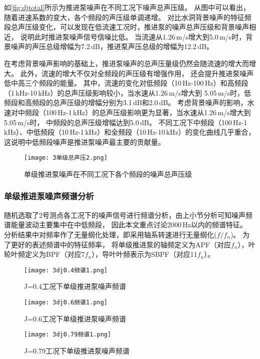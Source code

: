 如\autoref{fig:djtotal}所示为推进泵噪声在不同工况下噪声总声压级。
从图中可以看出，随着进速系数的变大，各个频段的声压级单调递增。
对比水洞背景噪声的特征频段总声压级变化，可以发现在低流速工况时，推进泵的噪声总声压级和背景噪声相近，
说明此时推进泵噪声信号信噪比低。
当流速从1.26\,m/s增大到5.0\,m/s时，背景噪声的声压总级增幅为7.2\,dB，推进泵声压总级的增幅为12.2\,dB。

在考虑背景噪声影响的基础上，推进泵噪声的总声压量级仍然会随流速的增大而增大。
此外，流速的增大不仅对全频段的声压级有增强作用，
还会提升推进泵噪声低中高三个频段的能量。
其中，流速的变化对低频段（10\,Hz-100\,Hz）和高频段（1\,kHz-10\,kHz）的总声压级影响较小，当水速从1.26\,m/s增大到
5.05\,m/s时，低频段和高频段的总声压级的增幅分别为3.1\,dB和2.0\,dB。
考虑背景噪声的影响，水速对中频段（100\,Hz-1\,kHz）的总声压级影响更为显著，当水速从1.26\,m/s增大到5.05\,m/s时，
中频段的总声压级增幅达到5.0\,dB。
不同工况下中频段（100\,Hz-1\,kHz）、中低频段（10\,Hz-1\,kHz）和全频段（10\,Hz-10\,kHz）的变化曲线几乎重合，
这说明中低频段噪声是推进泵噪声最主要的贡献量。
\begin{figure}[htbp]
    \centering
    \texttt{[image: 3单级总声压2.png]}
    \caption{\label{fig:djtotal}单级推进泵噪声在不同工况下各个频段的噪声总声压级}
\end{figure}
\subsubsection{单级推进泵噪声频谱分析}
随机选取了2号测点各工况下的噪声信号进行频谱分析，由上小节分析可知噪声频谱能量波动主要集中在中低频段，
因此本文重点讨论2000\,Hz以内的频谱特征。
分析结果中对频率作了无量纲化处理，即采用轴系转速进行无量纲化($f/f_n$)。
为了更好的表述频谱中的特征频率，
将单级推进泵的轴频定义为APF（对应$f_n$），叶轮叶频定义为BPF（对应7$f_n$），导叶叶频表示为SBPF（对应11$f_n$）。
\begin{figure}[htbp]
    \centering
    \texttt{[image: 3dj0.4频谱1.png]}
    \caption{\label{fig:dj0.4}J=0.4工况下单级推进泵噪声频谱}
\end{figure}
\begin{figure}[htbp]
    \centering
    \texttt{[image: 3dj0.6频谱1.png]}
    \caption{\label{fig:dj0.6}J=0.6工况下单级推进泵噪声频谱}
\end{figure}
\begin{figure}[htbp]
    \centering
    \texttt{[image: 3dj0.79频谱1.png]}
    \caption{\label{fig:dj0.79}J=0.79工况下单级推进泵噪声频谱}
\end{figure}

